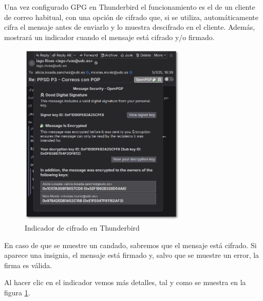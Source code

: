 \begin{tcolorbox}[
    colback=orange!5!white,
    colframe=orange!75!black,
    title=El indicador de cifrado
]
Una vez configurado GPG en Thunderbird el funcionamiento es el de un cliente de correo habitual, con una opción de cifrado que, si se utiliza, automáticamente cifra el mensaje antes de enviarlo y lo muestra descifrado en el cliente. Además, mostrará un indicador cuando el mensaje está cifrado y/o firmado.

\begin{figure}[H]
    \centering
    \includegraphics[width=8cm]{thunderbird-indicador-sombra.png}
    \caption{Indicador de cifrado en Thunderbird}
    \label{fig:indicador-cifrado}
\end{figure}

En caso de que se muestre un candado, sabremos que el mensaje está cifrado. Si aparece una insignia, el mensaje está firmado y, salvo que se muestre un error, la firma es válida.

Al hacer clic en el indicador vemos más detalles, tal y como se muestra en la figura \ref{fig:indicador-cifrado}.
\end{tcolorbox}


